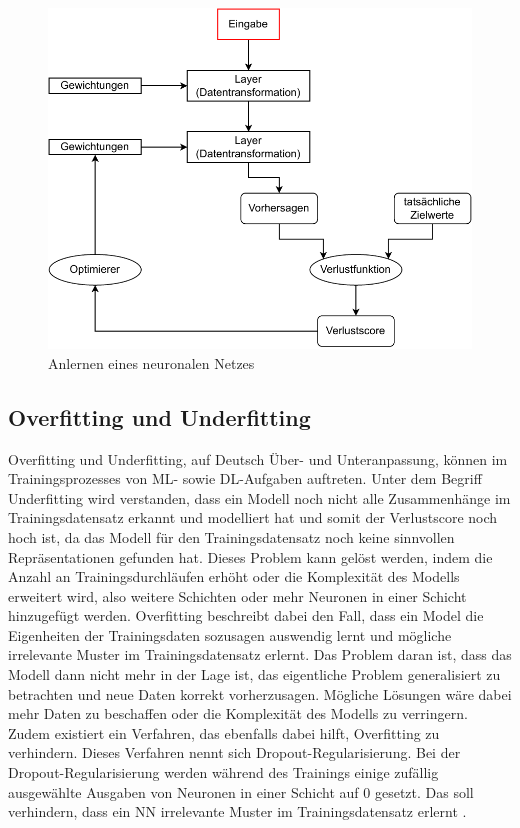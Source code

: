 \begin{figure}[H]
    \centering
    \includegraphics[width=\textwidth]{abbildungen/NN_anlernen.pdf}
    \caption{Anlernen eines neuronalen Netzes \cite[S.31]{DL_PY}}
    \label{fig:AnlernenNN}
\end{figure}

\subsection{Overfitting und Underfitting}
Overfitting und Underfitting, auf Deutsch Über- und Unteranpassung, können im Trainingsprozesses von \ac{ML}- sowie \ac{DL}-Aufgaben auftreten.
Unter dem Begriff Underfitting wird verstanden, dass ein Modell noch nicht alle Zusammenhänge im Trainingsdatensatz erkannt und modelliert hat und somit der Verlustscore noch hoch ist, 
da das Modell für den Trainingsdatensatz noch keine sinnvollen Repräsentationen gefunden hat. Dieses Problem kann gelöst werden, indem die Anzahl an Trainingsdurchläufen erhöht oder 
die Komplexität des Modells erweitert wird, also weitere Schichten oder mehr Neuronen in einer Schicht hinzugefügt werden. Overfitting beschreibt dabei den Fall,
dass ein Model die Eigenheiten der Trainingsdaten sozusagen auswendig lernt und mögliche irrelevante Muster im Trainingsdatensatz erlernt. Das Problem daran ist, dass das Modell 
dann nicht mehr in der Lage ist, das eigentliche Problem generalisiert zu betrachten und neue Daten korrekt vorherzusagen. Mögliche Lösungen wäre dabei mehr Daten zu beschaffen
oder die Komplexität des Modells zu verringern. Zudem existiert ein Verfahren, das ebenfalls dabei hilft, Overfitting zu verhindern. Dieses Verfahren nennt sich 
Dropout-Regularisierung. Bei der Dropout-Regularisierung werden während des Trainings einige zufällig ausgewählte Ausgaben von Neuronen in einer Schicht auf 0 gesetzt. Das soll verhindern,
dass ein \ac{NN} irrelevante Muster im Trainingsdatensatz erlernt \cite[vgl. S.142ff.]{DL_PY}. 

